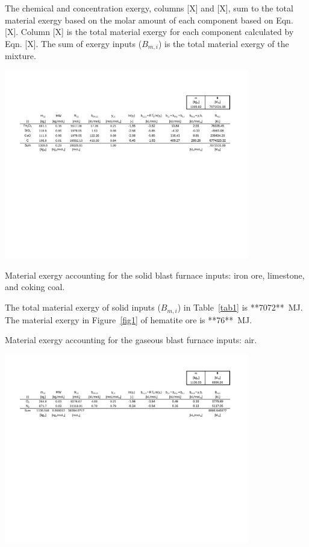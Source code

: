 \documentclass[energies,article,submit,pdftex,moreauthors]{Definitions/mdpi}
\begin{document}
The chemical and concentration exergy,
columns [X] and [X],
sum to the total material exergy
based on the molar amount
of each component
based on Eqn. [X].
Column [X] is the total material exergy
for each component
calculated by Eqn. [X].
The sum of exergy inputs ($B_{m,i}$)
is the total material exergy
of the mixture.


\begin{table}
  \centering
  \includegraphics[width=0.8\textwidth]{images/Solid BF Inputs.pdf}
  \caption{Material exergy accounting for the solid blast furnace inputs: iron ore, limestone, and coking coal.}
  \label{fig:Solid Blast Furnace Inputs}
\end{table}



The total material exergy of solid inputs ($B_{m,i}$)
in Table~\ref{tab1} is **7072**~MJ.
The material exergy in Figure~\ref{fig1}
of hematite ore is **76**~MJ.

\begin{table}
  \centering
  \caption{Material exergy accounting for the gaseous blast furnace inputs: air.}
  \label{fig:Gaseous Blast Furnace Inputs}
  \includegraphics[width=0.8\textwidth]{images/Air BF Inputs.pdf}

\end{table}
\end{document}
